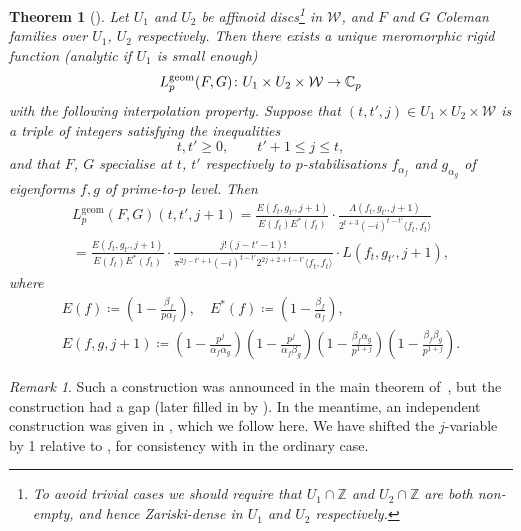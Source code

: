 \documentclass[11pt, a4paper, reqno]{amsart}
\theoremstyle{definition}
\theoremstyle{plain}
\newtheorem{theorem}[definition]{Theorem}
\theoremstyle{remark}
\newtheorem*{remark}{Remark}
\newcommand{\numberset}{\mathbb}
\newcommand{\C}{\numberset{C}}
\newcommand{\Z}{\numberset{Z}}
\newcommand{\Weight}{\mathcal{W}}
\newcommand{\Lgeom}{L_p^{\mathrm{geom}}}
\renewcommand{\ge}{\geqslant}
\renewcommand{\le}{\leqslant}
\begin{document}
  \begin{theorem}[\cite{loefflerzerbes16}]
   \label{thm:geometric-l-function}
   Let $U_1$ and $U_2$ be affinoid discs\footnote{To avoid trivial cases we should require that $U_1 \cap \Z$ and $U_2 \cap \Z$ are both non-empty, and hence Zariski-dense in $U_1$ and $U_2$ respectively.} in $\Weight$, and $F$ and $G$ Coleman families over $U_1$, $U_2$ respectively. Then there exists a unique meromorphic rigid function (analytic if $U_1$ is small enough)
   \[
    \Lgeom(F,G) \colon U_1\times U_2 \times \Weight \to \C_p \\
   \]
   with the following interpolation property. Suppose that $(t, t', j) \in U_1 \times U_2 \times \Weight$ is a triple of integers satisfying the inequalities
   \[ t, t' \ge 0, \qquad t' + 1 \le j \le t, \]
   and that $F$, $G$ specialise at $t$, $t'$ respectively to $p$-stabilisations $f_{\alpha_f}$ and $g_{\alpha_g}$ of eigenforms $f, g$ of prime-to-$p$ level. Then
   \begin{multline*}
     \Lgeom(F,G)(t,t',j+1) =\frac{E(f_{t},g_{t'},j+1)}{E(f_{t})E^*(f_{t})} \cdot \frac{\Lambda(f_t, g_{t'}, j + 1)}{2^{t + 3}(-i)^{t-t'}\langle f_t, f_t \rangle} \\ =\frac{E(f_{t},g_{t'},j+1)}{E(f_{t})E^*(f_{t})} \cdot \frac{j!(j-t'-1)!}{\pi^{2j-t'+1}(-i)^{t-t'}2^{2j+2+t-t'}\langle f_{t},f_{t}\rangle} 
     \cdot L(f_{t},g_{t'},j+1),
    \end{multline*}
    where
    \begin{gather*}
    E(f) \coloneqq \left(1-\tfrac{\beta_f}{p\alpha_f}\right), \quad E^*(f) \coloneqq \left(1-\tfrac{\beta_f}{\alpha_f}\right), \\
    E(f,g,j+1) \coloneqq \left(1-\tfrac{p^j}{\alpha_f\alpha_g}\right) \left(1-\tfrac{p^j}{\alpha_f\beta_g}\right) \left(1-\tfrac{\beta_f\alpha_g}{p^{1+j}}\right) \left(1-\tfrac{\beta_f\beta_g}{p^{1+j}}\right).
   \end{gather*}
  \end{theorem}

  \begin{remark}
   Such a construction was announced in the main theorem of~\cite[\S 4.4]{Urban-nearly-overconvergent}, but the construction had a gap (later filled in by \cite{andreattaiovita21}). In the meantime, an independent construction was given in \cite{loefflerzerbes16}, which we follow here. We have shifted the $j$-variable by 1 relative to \cite{loefflerzerbes16}, for consistency with \cite{Dasgupta-factorization} in the ordinary case.
  \end{remark}
\end{document}

